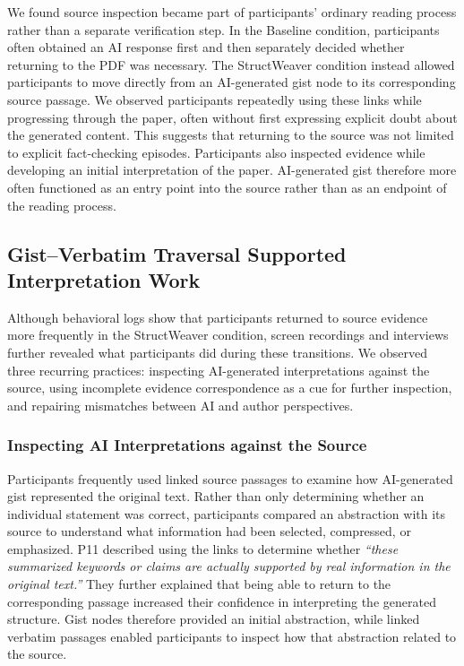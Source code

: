 \documentclass[manuscript,review,anonymous]{acmart}
\begin{document}
We found source inspection became part of participants' ordinary reading process rather than a separate verification step. In the Baseline condition, participants often obtained an AI response first and then separately decided whether returning to the PDF was necessary. The StructWeaver condition instead allowed participants to move directly from an AI-generated gist node to its corresponding source passage. We observed participants repeatedly using these links while progressing through the paper, often without first expressing explicit doubt about the generated content. 
This suggests that returning to the source was not limited to explicit fact-checking episodes. Participants also inspected evidence while developing an initial interpretation of the paper. AI-generated gist therefore more often functioned as an entry point into the source rather than as an endpoint of the reading process.


\subsection{Gist--Verbatim Traversal Supported Interpretation Work}
\label{sec:interpretation-work}

Although behavioral logs show that participants returned to source evidence more frequently in the StructWeaver condition, screen recordings and interviews further revealed what participants did during these transitions. We observed three recurring practices: inspecting AI-generated interpretations against the source, using incomplete evidence correspondence as a cue for further inspection, and repairing mismatches between AI and author perspectives.

\subsubsection{Inspecting AI Interpretations against the Source}

Participants frequently used linked source passages to examine how AI-generated gist represented the original text. Rather than only determining whether an individual statement was correct, participants compared an abstraction with its source to understand what information had been selected, compressed, or emphasized. P11 described using the links to determine whether \textit{``these summarized keywords or claims are actually supported by real information in the original text.''} They further explained that being able to return to the corresponding passage increased their confidence in interpreting the generated structure. Gist nodes therefore provided an initial abstraction, while linked verbatim passages enabled participants to inspect how that abstraction related to the source.
\end{document}
